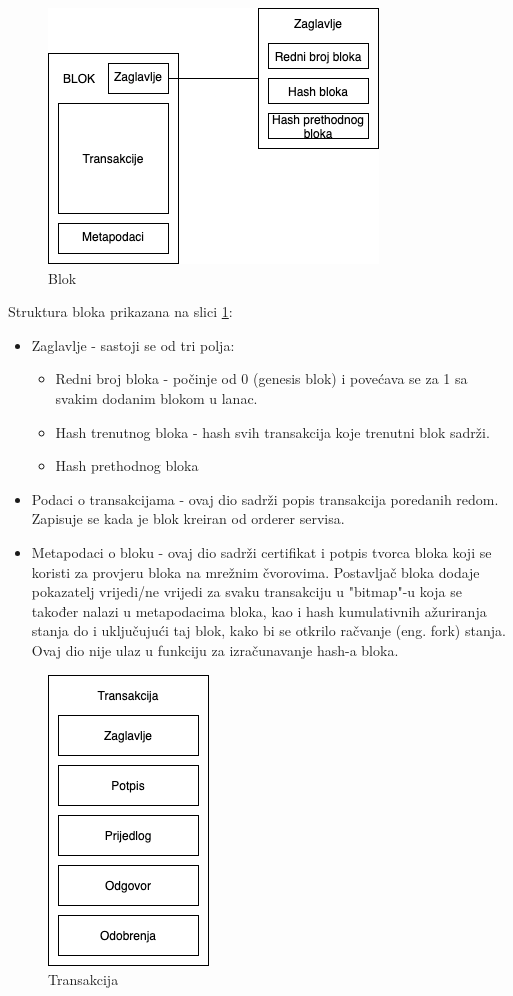 \documentclass[times, utf8, diplomski]{fer}
\begin{document}
\begin{figure}[htb]
\centering
\includegraphics[scale=0.5]{imgs/Block.png}
\caption{Blok}
\label{fig:blok}
\end{figure}

Struktura bloka prikazana na slici \ref{fig:blok}:
\begin{itemize}
\item Zaglavlje - sastoji se od tri polja:
	\begin{itemize}
		\item Redni broj bloka - počinje od 0 (genesis blok) i povećava se za 1 sa svakim dodanim blokom u lanac.
		\item Hash trenutnog bloka - hash svih transakcija koje trenutni blok sadrži.
		\item Hash prethodnog bloka
	\end{itemize}

\item Podaci o transakcijama - ovaj dio sadrži popis transakcija poredanih redom. Zapisuje se kada je blok kreiran od orderer servisa.
\item Metapodaci o bloku - ovaj dio sadrži certifikat i potpis tvorca bloka koji se koristi za provjeru bloka na mrežnim čvorovima.  Postavljač bloka dodaje pokazatelj vrijedi/ne vrijedi za svaku transakciju u "bitmap"-u koja se također nalazi u metapodacima bloka,  kao i hash kumulativnih ažuriranja stanja do i uključujući taj blok,  kako bi se otkrilo račvanje (eng. fork) stanja.  Ovaj dio nije ulaz u funkciju za izračunavanje hash-a bloka.
\end{itemize}

\begin{figure}[htb]
\centering
\includegraphics[scale=0.5]{imgs/Transakcija.png}
\caption{Transakcija}
\label{fig:transakcija}
\end{figure}
\end{document}
